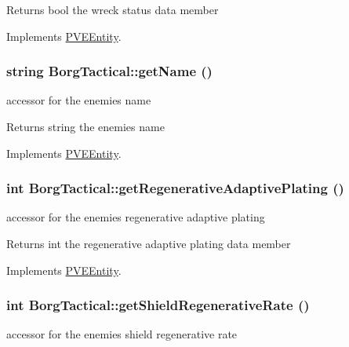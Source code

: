 \begin{DoxyReturn}{Returns}
bool the wreck status data member 
\end{DoxyReturn}


Implements \hyperlink{classPVEEntity}{PVEEntity}.

\hypertarget{classBorgTactical_a456907d48bdd59c8300d9087ba99e1fb}{
\subsubsection[{getName}]{\setlength{\rightskip}{0pt plus 5cm}string BorgTactical::getName ()}}
\label{d0/d4e/classBorgTactical_a456907d48bdd59c8300d9087ba99e1fb}
accessor for the enemies name

\begin{DoxyReturn}{Returns}
string the enemies name 
\end{DoxyReturn}


Implements \hyperlink{classPVEEntity}{PVEEntity}.

\hypertarget{classBorgTactical_a2a2943c732727f0d80c63500b5ca527c}{
\subsubsection[{getRegenerativeAdaptivePlating}]{\setlength{\rightskip}{0pt plus 5cm}int BorgTactical::getRegenerativeAdaptivePlating ()}}
\label{d0/d4e/classBorgTactical_a2a2943c732727f0d80c63500b5ca527c}
accessor for the enemies regenerative adaptive plating

\begin{DoxyReturn}{Returns}
int the regenerative adaptive plating data member 
\end{DoxyReturn}


Implements \hyperlink{classPVEEntity}{PVEEntity}.

\hypertarget{classBorgTactical_a6695595b8993d01254cbe36676ddfb5a}{
\subsubsection[{getShieldRegenerativeRate}]{\setlength{\rightskip}{0pt plus 5cm}int BorgTactical::getShieldRegenerativeRate ()}}
\label{d0/d4e/classBorgTactical_a6695595b8993d01254cbe36676ddfb5a}
accessor for the enemies shield regenerative rate

